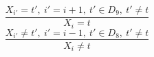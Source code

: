 $$\frac{X_{i'}=t',~i'=i+1,~t' \in D_{9},~t' \neq t}{X_{i}=t}$$ $$\frac{X_{i'} \neq t',~i'=i-1,~t' \in D_{8},~t' \neq t}{X_{i} \neq t}$$ 